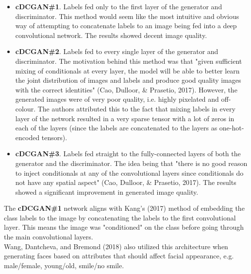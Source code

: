 \documentclass[11pt]{article}
\begin{document}
\begin{itemize}
\item
  \textbf{cDCGAN\#1}. Labels fed only to the first layer of the
  generator and discriminator. This method would seem like the most
  intuitive and obvious way of attempting to concatenate labels to an
  image being fed into a deep convolutional network. The results showed
  decent image quality.
  
      \begin{center}
    \end{center}
  
\item
  \textbf{cDCGAN\#2}. Labels fed to every single layer of the generator
  and discriminator. The motivation behind this method was that "given
  sufficient mixing of conditionals at every layer, the model will be
  able to better learn the joint distribution of images and labels and
  produce good quality images with the correct identities" (Cao,
  Dulloor, \& Prasetio, 2017). However, the generated images were of
  very poor quality, i.e. highly pixelated and off-colour. The authors
  attributed this to the fact that mixing labels in every layer of the
  network resulted in a very sparse tensor with a lot of zeros in each
  of the layers (since the labels are concatenated to the layers as
  one-hot-encoded tensors).
\item
  \textbf{cDCGAN\#3}. Labels fed straight to the fully-connected layers
  of both the generator and the discriminator. The idea being that
  "there is no good reason to inject conditionals at any of the
  convolutional layers since conditionals do not have any spatial
  aspect" (Cao, Dulloor, \& Prasetio, 2017). The results showed a
  significant improvement in generated image quality.
\end{itemize}

The \textbf{cDCGAN\#1} network aligns with Kang's (2017) method of
embedding the class labels to the image by concatenating the labels to
the first convolutional layer. This means the image was "conditioned" on
the class before going through the main convolutional layers.\\

Wang, Dantcheva, and Bremond (2018) also utilized this architecture when
generating faces based on attributes that should affect facial
appearance, e.g. male/female, young/old, smile/no smile.\\
\end{document}
